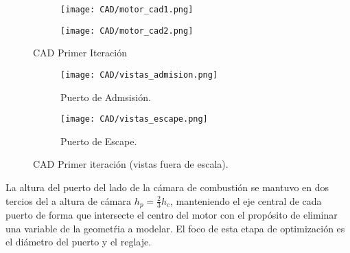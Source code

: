 
\begin{figure}[ht]
  \centering
    \begin{subfigure}{0.4\textwidth}
        \centering
        \texttt{[image: CAD/motor\_cad1.png]}
    \end{subfigure}
    \hfill
    \begin{subfigure}{0.4\textwidth}
        \centering
        \texttt{[image: CAD/motor\_cad2.png]}
    \end{subfigure}
  \caption{CAD Primer Iteración}\label{fig:motor_cad1}
\end{figure}


\begin{figure}[ht]
  \centering
    \begin{subfigure}{0.8\textwidth}
        \centering
        \texttt{[image: CAD/vistas\_admision.png]}
        \caption{Puerto de Admsisión.}
    \end{subfigure}
    \begin{subfigure}{0.8\textwidth}
        \centering
        \texttt{[image: CAD/vistas\_escape.png]}
        \caption{Puerto de Escape.}
    \end{subfigure}
  \caption{CAD Primer iteración (vistas fuera de escala).}\label{fig:motor_cad2}
\end{figure}

La altura del puerto del lado de la cámara de combustión se mantuvo en dos
tercios del a altura de cámara $h_{p} = \frac{2}{3}h_{c}$, manteniendo el eje
central de cada puerto de forma que intersecte el centro del motor con el
propósito de eliminar una variable de la geometŕia a modelar.
%
El foco de esta etapa de optimización es el diámetro del puerto y el reglaje.
%

